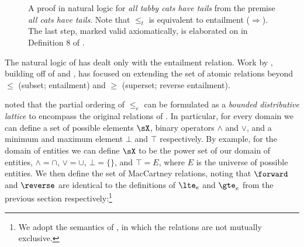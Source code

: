 \begin{figure*}
  \begin{prooftree}
  \end{prooftree}
\caption{\label{fig:catsproof}
  A proof in natural logic for \textit{all tabby cats have tails} from
    the premise \textit{all cats have tails}.
  Note that $\le_t$ is equivalent to entailment ($\Rightarrow$).
  The last step, marked valid axiomatically, is elaborated on in
    Definition 8 of .
} 
\end{figure*}


%
%
The natural logic of  has dealt only with the
  entailment relation.
Work by , building off of
   and
  ,
  has focused on extending the set of atomic relations
  beyond $\leq$ (subset; entailment) and 
  $\geq$ (superset; reverse entailment).

 noted that the partial ordering of
  $\leq_e$ can be formulated as a \textit{bounded distributive
  lattice} to encompass the original relations of
  .
In particular, for every domain we can define a set of possible 
  elements $\sX$, binary operators $\land$ and $\lor$,
  and a minimum and maximum element $\bot$ and $\top$ respectively.
By example, for the domain of entities we can define $\sX$ to be
  the power set of our domain of entities, $\land=\cap$,
  $\lor=\cup$, $\bot=\{\}$, and $\top=E$, where $E$ is the universe
  of possible entities.
We then define the set of MacCartney relations, noting that
  $\forward$ and $\reverse$ are identical to the definitions of
  $\lte_e$ and $\gte_e$ from the previous section respectively:\footnote{
    We adopt the semantics of , 
    in which the relations are not mutually exclusive.
  }

